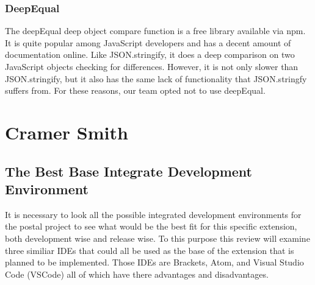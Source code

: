 \documentclass[letterpaper,10pt,titlepage,draftclsnofoot,onecolumn,onesided] {IEEEtran}
\begin{document}
\subsubsection{DeepEqual}
The deepEqual deep object compare function is a free library available via npm. 
It is quite popular among JavaScript developers and has a decent amount of documentation online. 
Like JSON.stringify, it does a deep comparison on two JavaScript objects checking for differences.
However, it is not only slower than JSON.stringify, but it also has the same lack of functionality that JSON.stringfy suffers from. 
For these reasons, our team opted not to use deepEqual. \cite{deep}


\section{Cramer Smith}
%
\subsection{The Best Base Integrate Development Environment} 
It is necessary to look all the possible integrated development environments for the postal project to see what would be the best fit for this specific extension, both development wise and release wise.
To this purpose this review will examine three similiar IDEs that could all be used as the base of the extension that is planned to be implemented.
Those IDEs are Brackets, Atom, and Visual Studio Code (VSCode) all of which have there advantages and disadvantages.
\end{document}
